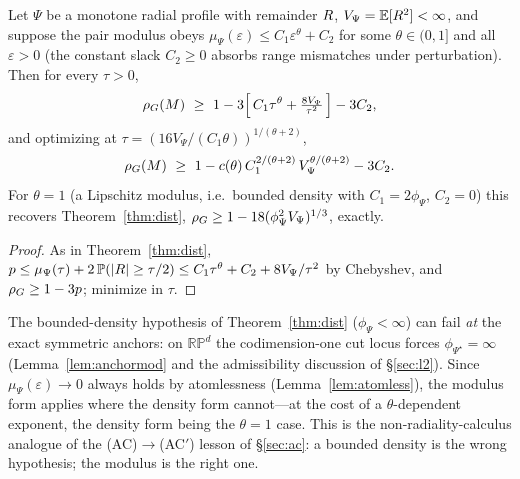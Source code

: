 \begin{theorem}\label{thm:modmaster}
Let $\Psi$ be a monotone radial profile with remainder $R$, $V_\Psi=\mathbb E[R^2]<\infty$, and
suppose the pair modulus obeys $\mu_\Psi(\varepsilon)\le C_1\varepsilon^\theta+C_2$ for some
$\theta\in(0,1]$ and all $\varepsilon>0$ (the constant slack $C_2\ge0$ absorbs range
mismatches under perturbation). Then for every $\tau>0$,
\[
\rhoG(M)\ \ge\ 1-3\Bigl[\,C_1\tau^\theta+\tfrac{8V_\Psi}{\tau^2}\,\Bigr]-3C_2,
\]
and optimizing at $\tau=(16V_\Psi/(C_1\theta))^{1/(\theta+2)}$,
\[
\rhoG(M)\ \ge\ 1-c(\theta)\,C_1^{2/(\theta+2)}\,V_\Psi^{\theta/(\theta+2)}-3C_2 .
\]
For $\theta=1$ (a Lipschitz modulus, i.e.\ bounded density with $C_1=2\phi_\Psi$, $C_2=0$)
this recovers Theorem~\ref{thm:dist}, $\rho_G\ge1-18(\phi_\Psi^2V_\Psi)^{1/3}$, exactly.
\end{theorem}

\begin{proof}
As in Theorem~\ref{thm:dist}, $p\le\mu_\Psi(\tau)+2\,\mathbb P(\lvert R\rvert\ge\tau/2)\le
C_1\tau^\theta+C_2+8V_\Psi/\tau^2$ by Chebyshev, and $\rho_G\ge1-3p$; minimize in $\tau$.
\end{proof}

\begin{remark}\label{rem:modneeded}
The bounded-density hypothesis of Theorem~\ref{thm:dist} ($\phi_\Psi<\infty$) can fail \emph{at}
the exact symmetric anchors: on $\mathbb{RP}^d$ the codimension-one cut locus forces
$\phi_{\Psi^\star}=\infty$ (Lemma~\ref{lem:anchormod} and the admissibility discussion of
\S\ref{sec:l2}). Since $\mu_\Psi(\varepsilon)\to0$ always holds by atomlessness
(Lemma~\ref{lem:atomless}), the modulus form applies where the density form cannot---at the
cost of a $\theta$-dependent exponent, the density form being the $\theta=1$ case. This is the
non-radiality-calculus analogue of the (AC)$\to$(AC$'$) lesson of \S\ref{sec:ac}: a bounded
density is the wrong hypothesis; the modulus is the right one.
\end{remark}

